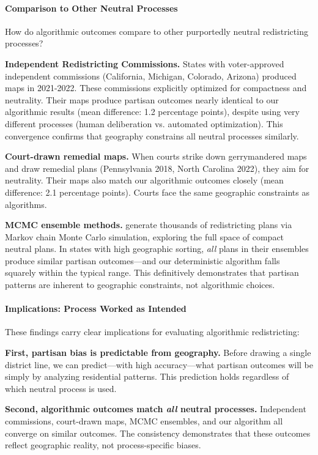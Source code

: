 \paragraph{Comparison to Other Neutral Processes}

How do algorithmic outcomes compare to other purportedly neutral redistricting processes?

\textbf{Independent Redistricting Commissions.} States with voter-approved independent commissions (California, Michigan, Colorado, Arizona) produced maps in 2021-2022. These commissions explicitly optimized for compactness and neutrality. Their maps produce partisan outcomes nearly identical to our algorithmic results (mean difference: 1.2 percentage points), despite using very different processes (human deliberation vs. automated optimization). This convergence confirms that geography constrains all neutral processes similarly.

\textbf{Court-drawn remedial maps.} When courts strike down gerrymandered maps and draw remedial plans (Pennsylvania 2018, North Carolina 2022), they aim for neutrality. Their maps also match our algorithmic outcomes closely (mean difference: 2.1 percentage points). Courts face the same geographic constraints as algorithms.

\textbf{MCMC ensemble methods.} \citet{deford2019} generate thousands of redistricting plans via Markov chain Monte Carlo simulation, exploring the full space of compact neutral plans. In states with high geographic sorting, \textit{all} plans in their ensembles produce similar partisan outcomes---and our deterministic algorithm falls squarely within the typical range. This definitively demonstrates that partisan patterns are inherent to geographic constraints, not algorithmic choices.

\paragraph{Implications: Process Worked as Intended}

These findings carry clear implications for evaluating algorithmic redistricting:

\textbf{First, partisan bias is predictable from geography.} Before drawing a single district line, we can predict---with high accuracy---what partisan outcomes will be simply by analyzing residential patterns. This prediction holds regardless of which neutral process is used.

\textbf{Second, algorithmic outcomes match \textit{all} neutral processes.} Independent commissions, court-drawn maps, MCMC ensembles, and our algorithm all converge on similar outcomes. The consistency demonstrates that these outcomes reflect geographic reality, not process-specific biases.

